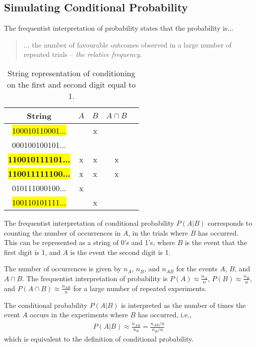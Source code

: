 \documentclass[11pt,a4paper]{article}
\begin{document}
\subsection{Simulating Conditional Probability}

The frequentist interpretation of probability states that the probability is...

\begin{quote}
... the number of favourable outcomes observed in a large number of repeated trials 
-- \emph{the relative frequency}.
\end{quote}

\begin{table}[h!]
\centering
\begin{tabular}{| c | c | c | c | c |}
\hline
String & \(A\) & \(B\) & \(A\cap B\) \\\hline
\hl{100010110001...} &    & x &   \\\hline
000100100101... &    &    &   \\\hline
\hl{\textbf{110010111101...}} & x & x & x \\\hline
\hl{\textbf{110011111100...}} & x & x & x \\\hline
010111000100... & x &    &    \\\hline
\hl{100110101111...} &    & x &    \\\hline
\end{tabular}
\caption{%
String representation of conditioning on the first and second digit equal to 1.
}
\end{table}

The frequentist interpretation of conditional probability \(P(A|B)\) 
corresponds to counting the number of occurrences in \(A\), 
in the trials where \(B\) has occurred. 
This can be represented as a string of 0's and 1's, 
where \(B\) is the event that the first digit is 1, 
and \(A\) is the event the second digit is 1.

The number of occurrences is given by \(n_{A}\), \(n_{B}\), and \(n_{AB}\) 
for the events \(A\), \(B\), and \(A \cap B\). 
The frequentist interpretation of probability is \(P(A) \approx \frac{n_{A}}{n}\), 
\(P(B) \approx \frac{n_{B}}{n}\), 
and \(P(A \cap B) \approx \frac{n_{AB}}{n}\)
for a large number of repeated experiments. 

The conditional probability \(P(A|B)\) is interpreted as 
the number of times the event \(A\) occurs in the experiments where \(B\) has occurred, i.e.,
\begin{align}
P\left( A | B \right) \approx \frac{n_{AB}}{n_{B}} = \frac{n_{AB}/n}{n_{B}/n}
\end{align}
which is equivalent to the definition of conditional probability.
\end{document}
